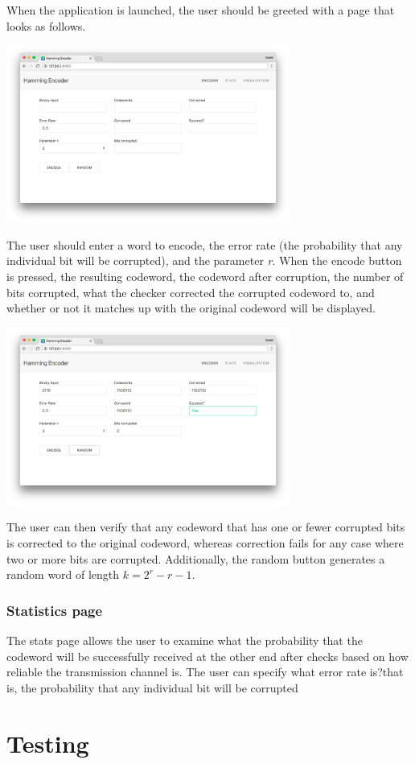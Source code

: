 \documentclass[11pt, oneside]{article}   	%
\begin{document}
When the application is launched, the user should be greeted with a page that looks as follows.

\begin{center}
\includegraphics[height=220px]{main_blank}
\end{center}

The user should enter a word to encode, the error rate (the probability that any individual bit will be corrupted), and the parameter \textit{r}. When the encode button is pressed, the resulting codeword, the codeword after corruption, the number of bits corrupted, what the checker corrected the corrupted codeword to, and whether or not it matches up with the original codeword will be displayed. 

\begin{center}
\includegraphics[height=220px]{main_code}
\end{center}

The user can then verify that any codeword that has one or fewer corrupted bits is corrected to the original codeword, whereas correction fails for any case where two or more bits are corrupted. Additionally, the random button generates a random word of length $k = 2^r - r - 1$. 

\subsubsection*{Statistics page}

The stats page allows the user to examine what the probability that the codeword will be successfully received at the other end after checks based on how reliable the transmission channel is. The user can specify what error rate is?that is, the probability that any individual bit will be corrupted

\section*{Testing}
\end{document}
